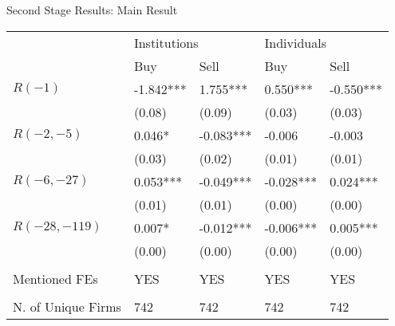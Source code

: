 \documentclass{beamer}
\begin{document}
\begin{frame}{Second Stage Results: Main Result}

    {\fontsize{10}{11} \selectfont

        \begin{tabular}{l*{4}{l}}
                               & \multicolumn{2}{l}{Institutions} & \multicolumn{2}{l}{Individuals}                         \\
            \cmidrule(l){2-3} \cmidrule(l){4-5}
                               & Buy                              & Sell                            & Buy       & Sell      \\
            \midrule
            \(R(-1)\)          & -1.842***                        & 1.755***                        & 0.550***  & -0.550*** \\
                               & (0.08)                           & (0.09)                          & (0.03)    & (0.03)    \\
            \(R(-2, -5)\)      & 0.046*                           & -0.083***                       & -0.006    & -0.003    \\
                               & (0.03)                           & (0.02)                          & (0.01)    & (0.01)    \\
            \(R(-6, -27)\)     & 0.053***                         & -0.049***                       & -0.028*** & 0.024***  \\
                               & (0.01)                           & (0.01)                          & (0.00)    & (0.00)    \\
            \(R(-28, -119)\)   & 0.007*                           & -0.012***                       & -0.006*** & 0.005***  \\
                               & (0.00)                           & (0.00)                          & (0.00)    & (0.00)    \\
                               &                                  &                                 &           &           \\
            Mentioned FEs      & YES                              & YES                             & YES       & YES       \\
                               &                                  &                                 &           &           \\
            N. of Unique Firms & 742                              & 742                             & 742       & 742       \\

\end{tabular}}
\end{frame}
\end{document}
